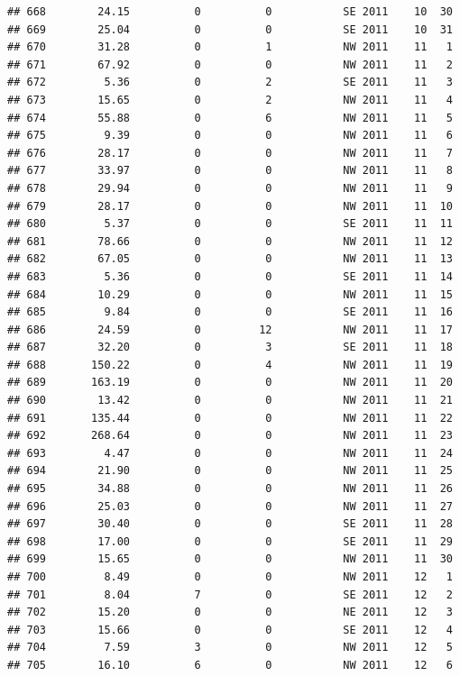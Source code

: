 \documentclass[
]{article}
\begin{document}
\begin{verbatim}
## 668        24.15          0          0           SE 2011    10  30
## 669        25.04          0          0           SE 2011    10  31
## 670        31.28          0          1           NW 2011    11   1
## 671        67.92          0          0           NW 2011    11   2
## 672         5.36          0          2           SE 2011    11   3
## 673        15.65          0          2           NW 2011    11   4
## 674        55.88          0          6           NW 2011    11   5
## 675         9.39          0          0           NW 2011    11   6
## 676        28.17          0          0           NW 2011    11   7
## 677        33.97          0          0           NW 2011    11   8
## 678        29.94          0          0           NW 2011    11   9
## 679        28.17          0          0           NW 2011    11  10
## 680         5.37          0          0           SE 2011    11  11
## 681        78.66          0          0           NW 2011    11  12
## 682        67.05          0          0           NW 2011    11  13
## 683         5.36          0          0           SE 2011    11  14
## 684        10.29          0          0           NW 2011    11  15
## 685         9.84          0          0           SE 2011    11  16
## 686        24.59          0         12           NW 2011    11  17
## 687        32.20          0          3           SE 2011    11  18
## 688       150.22          0          4           NW 2011    11  19
## 689       163.19          0          0           NW 2011    11  20
## 690        13.42          0          0           NW 2011    11  21
## 691       135.44          0          0           NW 2011    11  22
## 692       268.64          0          0           NW 2011    11  23
## 693         4.47          0          0           NW 2011    11  24
## 694        21.90          0          0           NW 2011    11  25
## 695        34.88          0          0           NW 2011    11  26
## 696        25.03          0          0           NW 2011    11  27
## 697        30.40          0          0           SE 2011    11  28
## 698        17.00          0          0           SE 2011    11  29
## 699        15.65          0          0           NW 2011    11  30
## 700         8.49          0          0           NW 2011    12   1
## 701         8.04          7          0           SE 2011    12   2
## 702        15.20          0          0           NE 2011    12   3
## 703        15.66          0          0           SE 2011    12   4
## 704         7.59          3          0           NW 2011    12   5
## 705        16.10          6          0           NW 2011    12   6

\end{verbatim}
\end{document}
